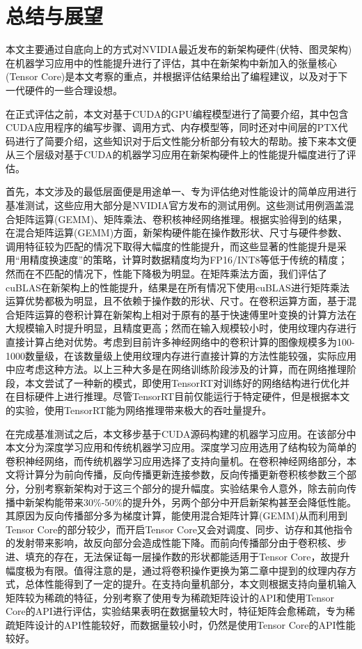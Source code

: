 \newpage
\section{总结与展望}
\setcounter{table}{0}
\setcounter{figure}{0}
\par 本文主要通过自底向上的方式对NVIDIA最近发布的新架构硬件(伏特、图灵架构)在机器学习应用中的性能提升进行了评估，其中在新架构中新加入的张量核心(Tensor Core)是本文考察的重点，并根据评估结果给出了编程建议，以及对于下一代硬件的一些合理设想。
\par 在正式评估之前，本文对基于CUDA的GPU编程模型进行了简要介绍，其中包含CUDA应用程序的编写步骤、调用方式、内存模型等，同时还对中间层的PTX代码进行了简要介绍，这些知识对于后文性能分析部分有较大的帮助。接下来本文便从三个层级对基于CUDA的机器学习应用在新架构硬件上的性能提升幅度进行了评估。
\par 首先，本文涉及的最低层面便是用途单一、专为评估绝对性能设计的简单应用进行基准测试，这些应用大部分是NVIDIA官方发布的测试用例。这些测试用例涵盖混合矩阵运算(GEMM)、矩阵乘法、卷积核神经网络推理。根据实验得到的结果，在混合矩阵运算(GEMM)方面，新架构硬件能在操作数形状、尺寸与硬件参数、调用特征较为匹配的情况下取得大幅度的性能提升，而这些显著的性能提升是采用“用精度换速度”的策略，计算时数据精度均为FP16/INT8等低于传统的精度；然而在不匹配的情况下，性能下降极为明显。在矩阵乘法方面，我们评估了cuBLAS在新架构上的性能提升，结果是在所有情况下使用cuBLAS进行矩阵乘法运算优势都极为明显，且不依赖于操作数的形状、尺寸。在卷积运算方面，基于混合矩阵运算的卷积计算在新架构上相对于原有的基于快速傅里叶变换的计算方法在大规模输入时提升明显，且精度更高；然而在输入规模较小时，使用纹理内存进行直接计算占绝对优势。考虑到目前许多神经网络中的卷积计算的图像规模多为100-1000数量级，在该数量级上使用纹理内存进行直接计算的方法性能较强，实际应用中应考虑这种方法。以上三种大多是在网络训练阶段涉及的计算，而在网络推理阶段，本文尝试了一种新的模式，即使用TensorRT对训练好的网络结构进行优化并在目标硬件上进行推理。尽管TensorRT目前仅能运行于特定硬件，但是根据本文的实验，使用TensorRT能为网络推理带来极大的吞吐量提升。
\par 在完成基准测试之后，本文移步基于CUDA源码构建的机器学习应用。在该部分中本文分为深度学习应用和传统机器学习应用。深度学习应用选用了结构较为简单的卷积神经网络，而传统机器学习应用选择了支持向量机。在卷积神经网络部分，本文将计算分为前向传播，反向传播更新连接参数，反向传播更新卷积核参数三个部分，分别考察新架构对于这三个部分的提升幅度。实验结果令人意外，除去前向传播中新架构能带来30\%-50\%的提升外，另两个部分中开启新架构甚至会降低性能。其原因为反向传播部分多为梯度计算，能使用混合矩阵计算(GEMM)从而利用到Tensor Core的部分较少，而开启Tensor Core又会对调度、同步、访存和其他指令的发射带来影响，故反向部分会造成性能下降。而前向传播部分由于卷积核、步进、填充的存在，无法保证每一层操作数的形状都能适用于Tensor Core，故提升幅度极为有限。值得注意的是，通过将卷积操作更换为第二章中提到的纹理内存方式，总体性能得到了一定的提升。在支持向量机部分，本文则根据支持向量机输入矩阵较为稀疏的特征，分别考察了使用专为稀疏矩阵设计的API和使用Tensor Core的API进行评估，实验结果表明在数据量较大时，特征矩阵会愈稀疏，专为稀疏矩阵设计的API性能较好，而数据量较小时，仍然是使用Tensor Core的API性能较好。
